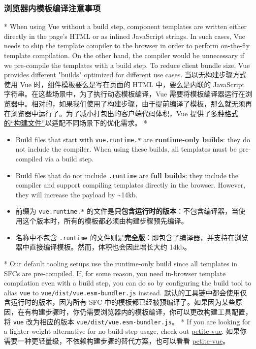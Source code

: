 \begin{paracol}{2}
\subsubsection{浏览器内模板编译注意事项}
\switchcolumn[0]*%
When using Vue without a build step, component templates are written
either directly in the page's HTML or as inlined JavaScript strings. In
such cases, Vue needs to ship the template compiler to the browser in
order to perform on-the-fly template compilation. On the other hand, the
compiler would be unnecessary if we pre-compile the templates with a
build step. To reduce client bundle size, Vue provides
\href{https://unpkg.com/browse/vue@3/dist/}{different "builds"}
optimized for different use cases.
\switchcolumn
当以无构建步骤方式使用 Vue 时，组件模板要么是写在页面的 HTML
中，要么是内联的 JavaScript
字符串。在这些场景中，为了执行动态模板编译，Vue
需要将模板编译器运行在浏览器中。相对的，如果我们使用了构建步骤，由于提前编译了模板，那么就无须再在浏览器中运行了。为了减小打包出的客户端代码体积，Vue
提供了\href{https://unpkg.com/browse/vue@3/dist/}{多种格式的``构建文件''}以适配不同场景下的优化需求。
\switchcolumn[0]*%
\begin{itemize}
\item
  Build files that start with \texttt{vue.runtime.*} are
  \textbf{runtime-only builds}: they do not include the compiler. When
  using these builds, all templates must be pre-compiled via a build
  step.
\item
  Build files that do not include \texttt{.runtime} are \textbf{full
  builds}: they include the compiler and support compiling templates
  directly in the browser. However, they will increase the payload by
  \textasciitilde14kb.
\end{itemize}
\switchcolumn
\begin{itemize}
\item
  前缀为 \texttt{vue.runtime.*}
  的文件是\textbf{只包含运行时的版本}：不包含编译器，当使用这个版本时，所有的模板都必须由构建步骤预先编译。
\item
  名称中不包含 \texttt{.runtime}
  的文件则是\textbf{完全版}：即包含了编译器，并支持在浏览器中直接编译模板。然而，体积也会因此增长大约
  14kb。
\end{itemize}
\switchcolumn[0]*%
Our default tooling setups use the runtime-only build since all
templates in SFCs are pre-compiled. If, for some reason, you need
in-browser template compilation even with a build step, you can do so by
configuring the build tool to alias \texttt{vue} to
\texttt{vue/dist/vue.esm-bundler.js} instead.
\switchcolumn
默认的工具链中都会使用仅含运行时的版本，因为所有 SFC
中的模板都已经被预编译了。如果因为某些原因，在有构建步骤时，你仍需要浏览器内的模板编译，你可以更改构建工具配置，将
\texttt{vue} 改为相应的版本 \texttt{vue/dist/vue.esm-bundler.js}。
\switchcolumn[0]*%
If you are looking for a lighter-weight alternative for no-build-step
usage, check out \href{https://github.com/vuejs/petite-vue}{petite-vue}.
\switchcolumn
如果你需要一种更轻量级，不依赖构建步骤的替代方案，也可以看看
\href{https://github.com/vuejs/petite-vue}{petite-vue}。
\end{paracol}

